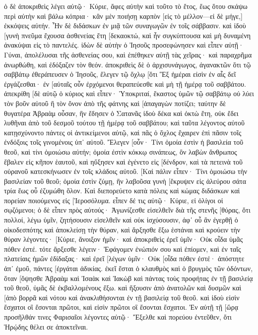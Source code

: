 ὁ δὲ ἀποκριθεὶς λέγει αὐτῷ· Κύριε, ἄφες αὐτὴν καὶ τοῦτο τὸ ἔτος, ἕως ὅτου σκάψω περὶ αὐτὴν καὶ βάλω κόπρια· 
κἂν μὲν ποιήσῃ καρπὸν [εἰς τὸ μέλλον—εἰ δὲ μήγε,] ἐκκόψεις αὐτήν. 
Ἦν δὲ διδάσκων ἐν μιᾷ τῶν συναγωγῶν ἐν τοῖς σάββασιν. 
καὶ ἰδοὺ [γυνὴ πνεῦμα ἔχουσα ἀσθενείας ἔτη [δεκαοκτώ, καὶ ἦν συγκύπτουσα καὶ μὴ δυναμένη ἀνακύψαι εἰς τὸ παντελές. 
ἰδὼν δὲ αὐτὴν ὁ Ἰησοῦς προσεφώνησεν καὶ εἶπεν αὐτῇ· Γύναι, ἀπολέλυσαι τῆς ἀσθενείας σου, 
καὶ ἐπέθηκεν αὐτῇ τὰς χεῖρας· καὶ παραχρῆμα ἀνωρθώθη, καὶ ἐδόξαζεν τὸν θεόν. 
ἀποκριθεὶς δὲ ὁ ἀρχισυνάγωγος, ἀγανακτῶν ὅτι τῷ σαββάτῳ ἐθεράπευσεν ὁ Ἰησοῦς, ἔλεγεν τῷ ὄχλῳ [ὅτι Ἓξ ἡμέραι εἰσὶν ἐν αἷς δεῖ ἐργάζεσθαι· ἐν [αὐταῖς οὖν ἐρχόμενοι θεραπεύεσθε καὶ μὴ τῇ ἡμέρᾳ τοῦ σαββάτου. 
ἀπεκρίθη [δὲ αὐτῷ ὁ κύριος καὶ εἶπεν· Ὑποκριταί, ἕκαστος ὑμῶν τῷ σαββάτῳ οὐ λύει τὸν βοῦν αὐτοῦ ἢ τὸν ὄνον ἀπὸ τῆς φάτνης καὶ [ἀπαγαγὼν ποτίζει; 
ταύτην δὲ θυγατέρα Ἀβραὰμ οὖσαν, ἣν ἔδησεν ὁ Σατανᾶς ἰδοὺ δέκα καὶ ὀκτὼ ἔτη, οὐκ ἔδει λυθῆναι ἀπὸ τοῦ δεσμοῦ τούτου τῇ ἡμέρᾳ τοῦ σαββάτου; 
καὶ ταῦτα λέγοντος αὐτοῦ κατῃσχύνοντο πάντες οἱ ἀντικείμενοι αὐτῷ, καὶ πᾶς ὁ ὄχλος ἔχαιρεν ἐπὶ πᾶσιν τοῖς ἐνδόξοις τοῖς γινομένοις ὑπ᾽ αὐτοῦ. 
Ἔλεγεν [οὖν· Τίνι ὁμοία ἐστὶν ἡ βασιλεία τοῦ θεοῦ, καὶ τίνι ὁμοιώσω αὐτήν; 
ὁμοία ἐστὶν κόκκῳ σινάπεως, ὃν λαβὼν ἄνθρωπος ἔβαλεν εἰς κῆπον ἑαυτοῦ, καὶ ηὔξησεν καὶ ἐγένετο εἰς [δένδρον, καὶ τὰ πετεινὰ τοῦ οὐρανοῦ κατεσκήνωσεν ἐν τοῖς κλάδοις αὐτοῦ. 
[Καὶ πάλιν εἶπεν· Τίνι ὁμοιώσω τὴν βασιλείαν τοῦ θεοῦ; 
ὁμοία ἐστὶν ζύμῃ, ἣν λαβοῦσα γυνὴ [ἔκρυψεν εἰς ἀλεύρου σάτα τρία ἕως οὗ ἐζυμώθη ὅλον. 
Καὶ διεπορεύετο κατὰ πόλεις καὶ κώμας διδάσκων καὶ πορείαν ποιούμενος εἰς [Ἱεροσόλυμα. 
εἶπεν δέ τις αὐτῷ· Κύριε, εἰ ὀλίγοι οἱ σῳζόμενοι; ὁ δὲ εἶπεν πρὸς αὐτούς· 
Ἀγωνίζεσθε εἰσελθεῖν διὰ τῆς στενῆς [θύρας, ὅτι πολλοί, λέγω ὑμῖν, ζητήσουσιν εἰσελθεῖν καὶ οὐκ ἰσχύσουσιν, 
ἀφ᾽ οὗ ἂν ἐγερθῇ ὁ οἰκοδεσπότης καὶ ἀποκλείσῃ τὴν θύραν, καὶ ἄρξησθε ἔξω ἑστάναι καὶ κρούειν τὴν θύραν λέγοντες· [Κύριε, ἄνοιξον ἡμῖν· καὶ ἀποκριθεὶς ἐρεῖ ὑμῖν· Οὐκ οἶδα ὑμᾶς πόθεν ἐστέ. 
τότε ἄρξεσθε λέγειν· Ἐφάγομεν ἐνώπιόν σου καὶ ἐπίομεν, καὶ ἐν ταῖς πλατείαις ἡμῶν ἐδίδαξας· 
καὶ ἐρεῖ [λέγων ὑμῖν· Οὐκ [οἶδα πόθεν ἐστέ· ἀπόστητε ἀπ᾽ ἐμοῦ, πάντες [ἐργάται ἀδικίας. 
ἐκεῖ ἔσται ὁ κλαυθμὸς καὶ ὁ βρυγμὸς τῶν ὀδόντων, ὅταν [ὄψησθε Ἀβραὰμ καὶ Ἰσαὰκ καὶ Ἰακὼβ καὶ πάντας τοὺς προφήτας ἐν τῇ βασιλείᾳ τοῦ θεοῦ, ὑμᾶς δὲ ἐκβαλλομένους ἔξω. 
καὶ ἥξουσιν ἀπὸ ἀνατολῶν καὶ δυσμῶν καὶ [ἀπὸ βορρᾶ καὶ νότου καὶ ἀνακλιθήσονται ἐν τῇ βασιλείᾳ τοῦ θεοῦ. 
καὶ ἰδοὺ εἰσὶν ἔσχατοι οἳ ἔσονται πρῶτοι, καὶ εἰσὶν πρῶτοι οἳ ἔσονται ἔσχατοι. 
Ἐν αὐτῇ τῇ [ὥρᾳ προσῆλθάν τινες Φαρισαῖοι λέγοντες αὐτῷ· Ἔξελθε καὶ πορεύου ἐντεῦθεν, ὅτι Ἡρῴδης θέλει σε ἀποκτεῖναι. 
